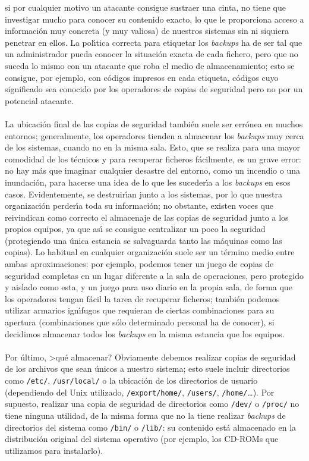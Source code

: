 si por cualquier motivo un atacante consigue sustraer una cinta, no tiene que
investigar mucho para conocer su contenido exacto, lo que le proporciona 
acceso a informaci\'on muy concreta (y muy valiosa) de nuestros sistemas sin ni 
siquiera penetrar en ellos. La pol\'{\i}tica correcta para etiquetar los {\it
backups} ha de ser tal que un administrador pueda conocer la situaci\'on exacta 
de cada fichero, pero que no suceda lo mismo con un atacante que roba el medio
de almacenamiento; esto se consigue, por ejemplo, con c\'odigos impresos en 
cada etiqueta, c\'odigos cuyo significado sea conocido por los operadores de
copias de seguridad pero no por un potencial atacante.\\
\\La ubicaci\'on final de las copias de seguridad tambi\'en suele ser err\'onea
en muchos entornos; generalmente, los operadores tienden a almacenar los {\it
backups} muy cerca de los sistemas, cuando no en la misma sala. Esto, que se
realiza para una mayor comodidad de los t\'ecnicos y para recuperar ficheros
f\'acilmente, es un grave error: no hay m\'as que imaginar cualquier desastre
del entorno, como un incendio o una inundaci\'on, para hacerse una idea de lo
que les suceder\'{\i}a a los {\it backups} en esos casos. Evidentemente, se
destruir\'{\i}an junto a los sistemas, por lo que nuestra organizaci\'on
perder\'{\i}a toda su informaci\'on; no obstante, existen voces que reivindican
como correcto el almacenaje de las copias de seguridad junto a los propios 
equipos, ya que as\'{\i} se consigue centralizar un poco la seguridad 
(protegiendo una \'unica estancia se salvaguarda tanto las m\'aquinas como las
copias). Lo habitual en cualquier organizaci\'on suele ser un t\'ermino 
medio entre ambas aproximaciones: por ejemplo, podemos tener un juego de copias
de seguridad completas en un lugar diferente a la sala de operaciones, pero
protegido y aislado como esta, y un juego para uso diario en la propia sala,
de forma que los operadores tengan f\'acil la tarea de recuperar ficheros;
tambi\'en podemos utilizar armarios ign\'{\i}fugos que requieran de ciertas 
combinaciones para su apertura (combinaciones que s\'olo determinado personal 
ha de conocer), si decidimos almacenar todos los {\it backups} en la misma 
estancia que los equipos.\\
\\Por \'ultimo, >qu\'e almacenar? Obviamente debemos realizar copias de 
seguridad de los
archivos que sean \'unicos a nuestro sistema; esto suele incluir directorios
como {\tt /etc/}, {\tt /usr/local/} o la ubicaci\'on de los directorios de
usuario (dependiendo del Unix utilizado, {\tt /export/home/}, {\tt /users/}, 
{\tt /home/}\ldots). Por supuesto, realizar una copia de seguridad de
directorios como {\tt /dev/} o {\tt /proc/} no tiene ninguna utilidad, de la
misma forma que no la tiene realizar {\it backups} de directorios del sistema
como {\tt /bin/} o {\tt /lib/}: su contenido est\'a almacenado en la 
distribuci\'on original del sistema operativo (por ejemplo, los CD-ROMs que 
utilizamos para instalarlo).
